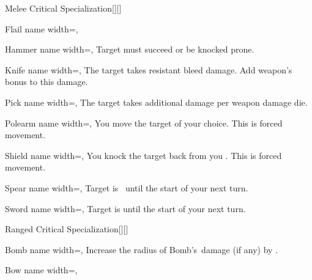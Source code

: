 \begin{PageFront}
\begin{Tables}{\frontTableHeight}
\begin{Table}{Melee Critical Specialization}[][]
\begin{entry}{Flail}{%
                name width=\conditionLength,%
            }
            \end{entry}
            \begin{entry}{Hammer}{%
                name width=\conditionLength,%
            }
                Target must succeed \Fortitude[][before=Class] or be knocked prone.
            \end{entry}
            \begin{entry}{Knife}{%
                name width=\conditionLength,%
            }
                The target takes  resistant bleed damage. Add weapon's \Item bonus to this damage.
            \end{entry}
            \begin{entry}{Pick}{%
                name width=\conditionLength,%
            }
                The target takes  additional damage per weapon damage die.
            \end{entry}
            \begin{entry}{Polearm}{%
                name width=\conditionLength,%
            }
                You move the target  \Feet of your choice. This is forced movement.
            \end{entry}
            \begin{entry}{Shield}{%
                name width=\conditionLength,%
            }
                You knock the target back from you  \Feet. This is forced movement.
            \end{entry}
            \begin{entry}{Spear}{%
                name width=\conditionLength,%
            }
                Target is \Clumsy\, until the start of your next turn.
            \end{entry}
            \begin{entry}{Sword}{%
                name width=\conditionLength,%
            }
                Target is \OffGuard until the start of your next turn.
            \end{entry}
        \end{Table}
        \TableSpace
        \begin{Table}{Ranged Critical Specialization}[][]
            \begin{entry}{Bomb}{%
                name width=\conditionLength,%
            }
                Increase the radius of Bomb's \Splash\,damage {(if any)} by  \Feet.
            \end{entry}
            \begin{entry}{Bow}{%
                name width=\conditionLength,%
            }

\end{entry}
\end{Table}
\end{Tables}
\end{PageFront}
